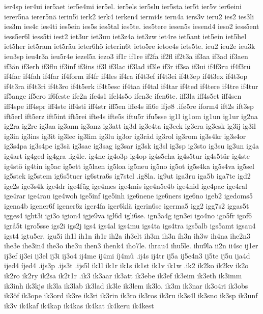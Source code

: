 {{ier4sp
ier4ui
ier5aet
ier5e4mi
ier5el.
ier5els
ier5slu
ier5sta
ier5t
ier5v
ier6eini
ierer5na
ierer5nä
ierin5i
ierk2
ierk4
ierken4
iermi4s
iern4a
iers3v
ieru2
ies2
ies3li
ies3m
ies4c
ies4ti
ies5ein
ies5s
ies5tal
ies5te.
ies5tere
iesen5s
iesend4
ieso2
iess5ent
iess5er6l
iess5ti
iest2
iet3ur
iet3uu
iet3z4a
iet3zw
iet4re
iet5ant
iet5ein
iet5hel
iet5her
iet5ram
iet5räu
ieter6hö
ieterin6t
ieto5re
ietoe4s
iets5te.
ieu2
ieu2e
ieu3k
ieu3sp
ieu4r3a
ieu5r4e
iezel5a
iezo3
if1r
if1re
if2fa
if2fl
if2t3a
if3aa
if3ad
if3aen
if3än
if3erh
if3flu
if3inf
if3ins
if3l
if3lac
if3lad
if3le
if3r
if3sa
if3ui
if4f3ru
if4f3rü
if4fac
if4fah
if4far
if4form
if4fr
if4les
if4ra
if4t3ef
if4t3ei
if4t3ep
if4t3ex
if4t3op
if4t3ra
if4t3ri
if4t3ro
if4t5erk
if4t5esc
if4taa
if4tal
if4tar
if4ted
if4tere
if4tre
if4tur
if5ange
if5ero
if6feste
ife2n
ife4s1
ifel4s5o
ifen3e
ifen6te.
iff3la
iff4s5et
iff4sen
iff4spe
iff4spr
iff4ste
iff4sti
iff4str
iff5en
iffe4s
ifi6e
ifjø8
.ifø5re
iform4
ift2s
ift3sp
ift5erl
ift5erz
ift5int
ift5rei
ifte4s
ifte5s
iftu5r
ifu5sse
ig1l
ig1om
ig1un
ig1ur
ig2na
ig2ra
ig2re
ig3aa
ig3ann
ig3anz
ig3att
ig3d
ig3e4ta
ig3eck
ig3era
ig3esk
ig3ij
ig3il
ig3in
ig3ins
ig3it
ig3lec
ig3lim
ig3lu
ig3or
ig3råd
ig3rol
ig3rom
ig3s4kr
ig3s4or
ig3s4pa
ig3s4pe
ig3sä
ig3sae
ig3sag
ig3sar
ig3sk
ig3sl
ig3sp
ig3sto
ig3su
ig3un
ig4a
ig4art
ig4ged
ig4gra
.ig4le.
ig4ne
ig4o3p
ig4op
ig4s5cha
ig4s5tur
ig4s5tür
ig4ste
ig4stö
ig4tin
ig5ac
ig5ett
ig5laen
ig5loa
ig5neu
ig5no
ig5ot
ig5s4ka
ig5s4va
ig5sel
ig5stek
ig5stem
ig6s5tuer
ig6stra6s
ig7stel
.ig8la.
ig9ut
iga3ru
iga5b
iga7te
igd2
ige2s
ige3s4k
ige4dr
ige4füg
ige4mes
ige4mis
ige4n5e4b
ige4nid
ige4pac
ige4ral
ige4rar
ige4rau
ige4woh
ige5inf
ige5inh
ige6nene
ige6ners
ige6no
igeb2
igedoms5
igena4b
igener6f
igener6z
iger4fa
iger6klä
igerin6se
igerma5
igg2
igg7s2
iggas5t
igges4
ight3i
igi3o
igion4
igje9va
igl6d
igli6se.
ign3a4g
ign3ei
igo4no
igo5fr
igof6
igrå5t
igro5sse
igs2i
igs2j
igs4
igs4al
igs4mu
igs4ta
igs4tra
igs5alb
igs5amt
igsau4
igst4
igtu5er.
igu5i
ih1l
ih1n
ih1r
ih2a
ih3elt
ih3m
ih3n
íh3n
ih3w
ih4na
ihe2n3
ihe3e
ihe3in4
ihe3o
ihe3u
ihen3
ihenk4
iho7le.
ihrau4
ihu5le.
ihu9la
ii2n
ii4sc
ij1er
ij3ef
ij3ei
ij3el
ij3i
ij3o4
ij4me
ij4mi
íj4mů
.ij4s
ij4tr
ij5a
ij5e4n3
ij5te
ij5u
ija4d
ijed4
íjed4
.ijs3p
.ijs3t
.ijs5l
ik1l
ik1r
ik1s
ik1st
ik1v
ik1w
.ik2
ik2ko
ik2kv
ik2o
ik2ro
ik2ry
ik2sa
ik2t1r
.ik3
ik3aar
ik3att
ik3ebe
ik3ef
ik3eim
ik3eth
ik3imm
ik3inh
ik3kjø
ik3la
ik3lab
ik3lad
ik3le
ik3lem
ik3lo.
ik3m
ik3nar
ik3o4ri
ik3obs
ik3öf
ik3ope
ik3ord
ik3re
ik3ri
ik3rin
ik3ro
ik3ros
ik3ru
ik3s4l
ik3sno
ik3sp
ik3unf
ik3v
ik4kaf
ik4kap
ik4kas
ik4kat
ik4keru
ik4kest
}}
